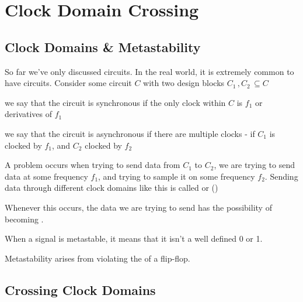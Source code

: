 \chapter{Clock Domain Crossing}

\section{Clock Domains \& Metastability}

So far we've only discussed  circuits. In the real world, it is extremely common to have  circuits. Consider some circuit $C$ with two design blocks $C_1\,,C_2\,\subseteq C$
\begin{bullets}
	\item we say that the circuit is synchronous if the only clock within $C$ is $f_1$ or derivatives of $f_1$
	\item we say that the circuit is asynchronous if there are multiple clocks - if $C_1$ is clocked by $f_1$, and $C_2$ clocked by $f_2$
\end{bullets}

A problem occurs when trying to send data from $C_1$ to $C_2$, we are trying to send data at some frequency $f_1$, and trying to sample it on some frequency $f_2$. Sending data through different clock domains like this is called  or ()

Whenever this occurs, the data we are trying to send has the possibility of becoming .
\begin{bullets}
	\item When a signal is metastable, it means that it isn't a well defined 0 or 1.
	\item Metastability arises from violating the  of a flip-flop.
\end{bullets}

\section{Crossing Clock Domains}

